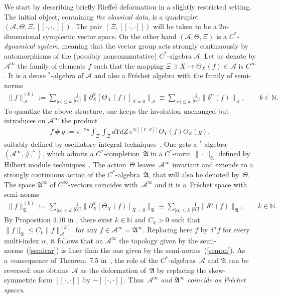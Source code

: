 \documentclass[11pt]{article}
\def\A{{\mathcal A}}
\def\Th{\Theta}
\def\N{\mathbb{N}}
\def\AA{\mathfrak A}
\def\Ai{\mathcal A^\infty}
\def\AAi{\mathfrak A^\infty}
\begin{document}
We start by describing brief\/ly Rief\/fel deformation \cite{Rie1,Rie2} in a slightly restricted setting.
The initial object, containing {\it the classical data}, is a quadruplet
$\left(\A,\Theta,\Xi,[\![\cdot,\cdot,]\!]\right)$. The pair $\left(\Xi,[\![\cdot,\cdot]\!]\right)$ will
be taken to be a $2n$-dimensional symplectic vector space.
On the other hand $\left(\A,\Theta,\Xi\right)$ is a $C^*$-{\it dynamical system},
meaning that the vector group
acts strongly continuously by automorphisms of the (possibly noncommutative) $C^*$-algebra $\A$.
Let us denote by $\Ai$ the family of elements $f$ such that the mapping
$\Xi\ni X\mapsto\Th_X(f)\in\mathcal A$ is
$C^\infty$. It is a dense $^*$-algebra of $\A$ and also a Fr\'echet algebra with the family of semi-norms
\begin{gather}\label{semicar}
\| f\|_\A^{(k)}:=\sum_{|\alpha|\le
k}\frac{1}{|\alpha|!}\|\partial_X^\alpha\left[\Th_X(f)\right]_{X=0}\|_\A \equiv\sum_{|\alpha|\le
k}\frac{1}{|\alpha|!}\|\delta^\alpha (f)\|_\A ,
\qquad k\in\N .
\end{gather}
To quantize the above structure, one keeps the involution unchanged but introduces on $\Ai$ the product
\begin{gather*}%
f\,\#\,g:=\pi^{-2n}\int_\Xi\int_\Xi dYdZ\,e^{2i[\![Y,Z]\!]} \Th_Y(f) \Th_Z(g) ,
\end{gather*}
suitably def\/ined by oscillatory integral techniques~\cite{Fol89,Rie1}. One gets a $^*$-algebra $(\Ai,\#,^*)$, which admits a
$C^*$-completion~$\AA$ in a $C^*$-norm $\|\cdot\|_\AA$ def\/ined by Hilbert module techniques~\cite{Rie1}.
The action~$\Th$ leaves~$\Ai$ invariant and extends to a strongly continuous action of the
$C^*$-algebra~$\AA$, that will also be denoted by~$\Th$. The space $\AAi$ of $C^\infty$-vectors coincides with~$\Ai$
and it is a~Fr\'echet space with semi-norms
\begin{gather}\label{semon}
\| f\|_\AA^{(k)}:=\sum_{|\alpha|\le k}\frac{1}{|\alpha|!}\|\partial_X^\alpha\left[\Th_X(f)\right]_{X=0}
\|_\AA \equiv\sum_{|\alpha|\le
k}\frac{1}{|\alpha|!}\|\delta^\alpha (f)\|_\AA ,\qquad k\in\N  .
\end{gather}
By Proposition 4.10 in \cite{Rie1}, there exist $k\in\N $ and $C_k>0$ such that
$\| f\|_\AA \le C_k\| f\|^{(k)}_\A$ for any $f\in\A^\infty=\AA^\infty$.
Replacing here $f$ by $\delta^\alpha f$ for every multi-index $\alpha$, it follows that on $\A^\infty$ the topology given by
the semi-norms~(\ref{semicar}) is f\/iner than the one given by the semi-norms~(\ref{semon}). As a~consequence of
Theorem~7.5 in~\cite{Rie1}, the role of the $C^*$-algebras~$\A$ and $\AA$ can be reversed: one obtains~$\A$ as the deformation
of~$\AA$ by replacing the skew-symmetric form $[\![\cdot,\cdot]\!]$ by $-[\![\cdot,\cdot]\!]$.
Thus~$\A^\infty$ {\it and $\AA^\infty$ coincide as Fr\'echet spaces}.
\end{document}
